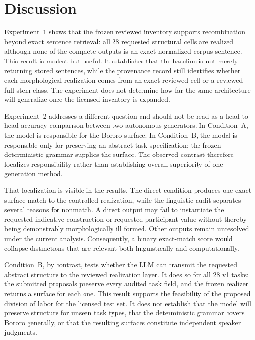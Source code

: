 \documentclass[11pt]{article}
\begin{document}
\section{Discussion}

Experiment~1 shows that the frozen reviewed inventory supports recombination
beyond exact sentence retrieval: all 28 requested structural cells are realized
although none of the complete outputs is an exact normalized corpus sentence.
This result is modest but useful. It establishes that the baseline is not merely
returning stored sentences, while the provenance record still identifies
whether each morphological realization comes from an exact reviewed cell or a
reviewed full stem class. The experiment does not determine how far the same
architecture will generalize once the licensed inventory is expanded.

Experiment~2 addresses a different question and should not be read as a
head-to-head accuracy comparison between two autonomous generators. In
Condition~A, the model is responsible for the Bororo surface. In Condition~B,
the model is responsible only for preserving an abstract task specification;
the frozen deterministic grammar supplies the surface. The observed contrast
therefore localizes responsibility rather than establishing overall superiority
of one generation method.

That localization is visible in the results. The direct condition produces one
exact surface match to the controlled realization, while the linguistic audit
separates several reasons for nonmatch. A direct output may fail to instantiate
the requested indicative construction or requested participant value without
thereby being demonstrably morphologically ill formed. Other outputs remain
unresolved under the current analysis. Consequently, a binary exact-match score
would collapse distinctions that are relevant both linguistically and
computationally.

Condition~B, by contrast, tests whether the LLM can transmit the requested
abstract structure to the reviewed realization layer. It does so for all 28 v1
tasks: the submitted proposals preserve every audited task field, and the
frozen realizer returns a surface for each one. This result supports the
feasibility of the proposed division of labor for the licensed test set. It
does not establish that the model will preserve structure for unseen task
types, that the deterministic grammar covers Bororo generally, or that the
resulting surfaces constitute independent speaker judgments.
\end{document}

